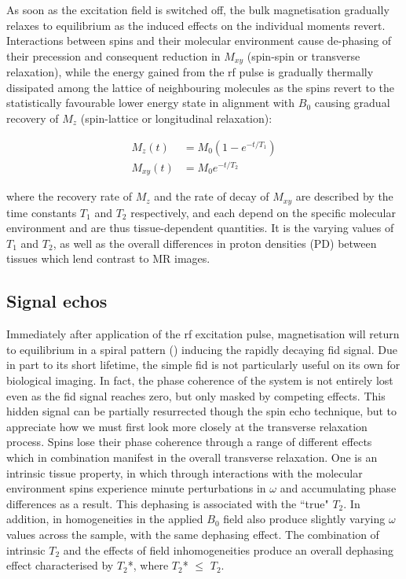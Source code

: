 As soon as the excitation field is switched off, the bulk magnetisation gradually relaxes to equilibrium as the induced effects on the individual moments revert.
Interactions between spins and their molecular environment cause de-phasing of their precession and consequent reduction in $M_{xy}$ (spin-spin or transverse relaxation), while the energy gained from the \gls{rf} pulse is gradually thermally dissipated among the lattice of neighbouring molecules as the spins revert to the statistically favourable lower energy state in alignment with $B_0$ causing gradual recovery of $M_z$ (spin-lattice or longitudinal relaxation):

\begin{align}
  M_z(t)  &= M_0 (1-e^{-t/T_1}) \\
  M_{xy}(t) &= M_0 e^{-t/T_2} \label{eq:recovery}
\end{align}

where the recovery rate of $M_z$ and the rate of decay of $M_{xy}$ are described by the time constants $T_1$ and $T_2$ respectively, and each depend on the specific molecular environment and are thus tissue-dependent quantities.
It is the varying values of $T_1$ and $T_2$, as well as the overall differences in proton densities (PD) between tissues which lend contrast to MR images.

\subsection{Signal echos}\label{sec:echos}

Immediately after application of the \gls{rf} excitation pulse, magnetisation will return to equilibrium in a spiral pattern () inducing the rapidly decaying \gls{fid} signal.
Due in part to its short lifetime, the simple \gls{fid} is not particularly useful on its own for biological imaging.
In fact, the phase coherence of the system is not entirely lost even as the \gls{fid} signal reaches zero, but only masked by competing effects.
This hidden signal can be partially resurrected though the spin echo technique, but to appreciate how we must first look more closely at the transverse relaxation process.
Spins lose their phase coherence through a range of different effects which in combination manifest in the overall transverse relaxation.
One is an intrinsic tissue property, in which through interactions with the molecular environment spins experience minute perturbations in $\omega$ and accumulating phase differences as a result.
This dephasing is associated with the ``true" $T_2$.
In addition, in homogeneities in the applied $B_0$ field also produce slightly varying $\omega$ values across the sample, with the same dephasing effect.
The combination of intrinsic $T_2$ and the effects of field inhomogeneities produce an overall dephasing effect characterised by $T_2$*, where  $T_2$* $\leqslant$ $T_2$.


